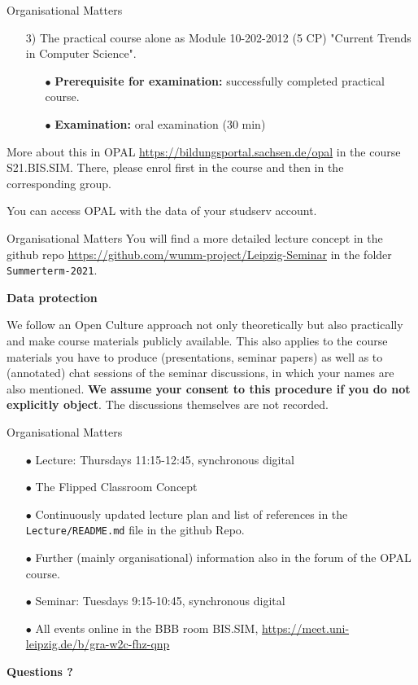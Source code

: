 \documentclass{beamer}
\newcommand{\ueberschrift}[1]{\begin{center}\bf #1\end{center}}
\begin{document}
\begin{frame}{Organisational Matters}
\begin{itemize}
\item[3)] The practical course alone as Module 10-202-2012 (5 CP) "Current
  Trends in Computer Science".
  \begin{itemize}[noitemsep]
  \item[$\bullet$] \textbf{Prerequisite for examination:} successfully
    completed practical course.
  \item[$\bullet$] \textbf{Examination:} oral examination (30 min)
  \end{itemize}
\end{itemize}
More about this in OPAL \url{https://bildungsportal.sachsen.de/opal} in the
course S21.BIS.SIM.  There, please enrol first in the course and then in the
corresponding group.

You can access OPAL with the data of your studserv account.

\end{frame}

\begin{frame}{Organisational Matters}
You will find a more detailed lecture concept in the github repo
\url{https://github.com/wumm-project/Leipzig-Seminar} in the folder
\texttt{Summerterm-2021}.

\ueberschrift{Data protection}

We follow an Open Culture approach not only theoretically but also practically
and make course materials publicly available. This also applies to the course
materials you have to produce (presentations, seminar papers) as well as to
(annotated) chat sessions of the seminar discussions, in which your names are
also mentioned. \textbf{We assume your consent to this procedure if you do not
  explicitly object}. The discussions themselves are not recorded.

\end{frame}

\begin{frame}{Organisational Matters}

\begin{itemize}
\item[$\bullet$] Lecture: Thursdays 11:15-12:45, synchronous digital
\item[$\bullet$] The Flipped Classroom Concept
\item[$\bullet$] Continuously updated lecture plan and list of references in
  the \texttt{Lecture/README.md} file in the github Repo.  
\item[$\bullet$] Further (mainly organisational) information also in the forum
  of the OPAL course.
\item[$\bullet$] Seminar: Tuesdays 9:15-10:45, synchronous digital
\item[$\bullet$] All events online in the BBB room BIS.SIM,
  \url{https://meet.uni-leipzig.de/b/gra-w2c-fhz-qnp}
\end{itemize}
\begin{center}\LARGE\bf
  Questions ?
\end{center}

\end{frame}
\end{document}
